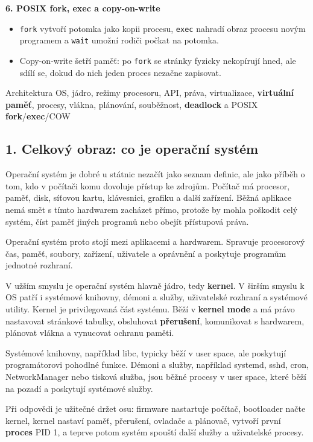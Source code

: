\documentclass[11pt,a4paper]{article}
\begin{document}
\textbf{6. POSIX fork, exec a copy-on-write}
\begin{itemize}
  \item \texttt{fork} vytvoří potomka jako kopii procesu, \texttt{exec} nahradí obraz procesu novým programem a \texttt{wait} umožní rodiči počkat na potomka.
  \item Copy-on-write šetří paměť: po \texttt{fork} se stránky fyzicky nekopírují hned, ale sdílí se, dokud do nich jeden proces nezačne zapisovat.
\end{itemize}

Architektura OS, jádro, režimy procesoru, API, práva, virtualizace, \textbf{virtuální paměť}, procesy, vlákna, plánování, souběžnost, \textbf{deadlock} a POSIX \textbf{fork}/\textbf{exec}/COW

\subsection*{1. Celkový obraz: co je operační systém}

Operační systém je dobré u státnic nezačít jako seznam definic, ale jako příběh o tom, kdo v počítači komu dovoluje přístup ke zdrojům. Počítač má procesor, paměť, disk, síťovou kartu, klávesnici, grafiku a další zařízení. Běžná aplikace nemá smět s tímto hardwarem zacházet přímo, protože by mohla poškodit celý systém, číst paměť jiných programů nebo obejít přístupová práva.

Operační systém proto stojí mezi aplikacemi a hardwarem. Spravuje procesorový čas, paměť, soubory, zařízení, uživatele a oprávnění a poskytuje programům jednotné rozhraní.

V užším smyslu je operační systém hlavně jádro, tedy \textbf{kernel}. V širším smyslu k OS patří i systémové knihovny, démoni a služby, uživatelské rozhraní a systémové utility. Kernel je privilegovaná část systému. Běží v \textbf{kernel mode} a má právo nastavovat stránkové tabulky, obsluhovat \textbf{přerušení}, komunikovat s hardwarem, plánovat vlákna a vynucovat ochranu paměti.

Systémové knihovny, například libc, typicky běží v user space, ale poskytují programátorovi pohodlné funkce. Démoni a služby, například systemd, sshd, cron, NetworkManager nebo tisková služba, jsou běžné procesy v user space, které běží na pozadí a poskytují systémové služby.

Při odpovědi je užitečné držet osu: firmware nastartuje počítač, bootloader načte kernel, kernel nastaví paměť, přerušení, ovladače a plánovač, vytvoří první \textbf{proces} PID 1, a teprve potom systém spouští další služby a uživatelské procesy.
\end{document}
